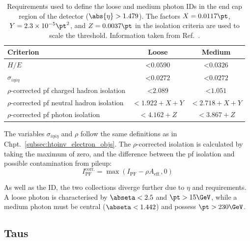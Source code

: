 \begin{table}[htbp]
    \centering
    \begin{tabular}{lcc}
        \hline
        Criterion & Loose & Medium \\\hline
        $H/E$ & $< \text{0.0590}$ & $< \text{0.0326}$ \\
        $\sigma_{i\eta i\eta}$ & $< \text{0.0272}$ & $< \text{0.0272}$ \\
        $\rho$-corrected \acrshort{pf} charged hadron isolation & $< \text{2.089}$ & $< \text{1.051}$ \\
        $\rho$-corrected \acrshort{pf} neutral hadron isolation & $< \text{1.922} + X + Y$ & $< \text{2.718} + X + Y$ \\
        $\rho$-corrected \acrshort{pf} photon isolation & $< \text{4.162} + Z$ & $< \text{3.867} + Z$ \\\hline
    \end{tabular}
    \caption[Requirements used to define the loose and medium photon IDs in the end cap region of the detector ($\abs{\eta} > \text{1.479}$)]{Requirements used to define the loose and medium photon IDs in the end cap region of the detector ($\abs{\eta} > \text{1.479}$). The factors $X = \text{0.0117}\pt$, $Y = \text{2.3} \times \text{10}^{-5}\pt^2$, and $Z = \text{0.0037}\pt$ in the isolation criteria are used to scale the threshold. Information taken from Ref.~.}
    \label{tab:htoinv_photon_ID_endcap}
\end{table}

The variables $\sigma_{i\eta i\eta}$ and $\rho$ follow the same definitions as in Chpt.~\ref{subsec:htoinv_electron_objs}. The $\rho$-corrected isolation is calculated by taking the maximum of zero, and the difference between the \acrlong{pf} isolation and possible contamination from pileup:
\begin{equation}
I_{\mathrm{PF}}^{\mathrm{corr.}} = \max (I_{\mathrm{PF}} - \rho A_{\mathrm{eff.}}, \text{0})
\end{equation}

As well as the ID, the two collections diverge further due to $\eta$ and \pt requirements. A loose photon is characterised by $\abseta < \text{2.5}$ and $\pt > \text{15}\GeV$, while a medium photon must be central ($\abseta < \text{1.442}$) and possess $\pt > \text{230}\GeV$.




\subsection{Taus}
\label{subsec:htoinv_tau_objs}

